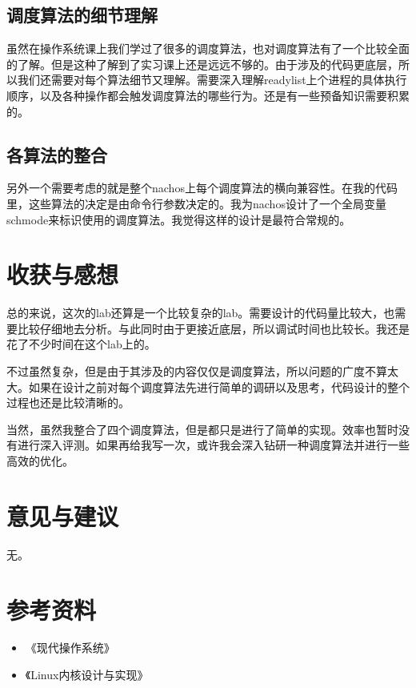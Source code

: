\documentclass{ctexart}
\begin{document}
\subsection*{调度算法的细节理解}
虽然在操作系统课上我们学过了很多的调度算法，也对调度算法有了一个比较全面的了解。但是这种了解到了实习课上还是远远不够的。由于涉及的代码更底层，所以我们还需要对每个算法细节又理解。需要深入理解readylist上个进程的具体执行顺序，以及各种操作都会触发调度算法的哪些行为。还是有一些预备知识需要积累的。
\subsection*{各算法的整合}
另外一个需要考虑的就是整个nachos上每个调度算法的横向兼容性。在我的代码里，这些算法的决定是由命令行参数决定的。我为nachos设计了一个全局变量schmode来标识使用的调度算法。我觉得这样的设计是最符合常规的。

\section{收获与感想}
总的来说，这次的lab还算是一个比较复杂的lab。需要设计的代码量比较大，也需要比较仔细地去分析。与此同时由于更接近底层，所以调试时间也比较长。我还是花了不少时间在这个lab上的。

不过虽然复杂，但是由于其涉及的内容仅仅是调度算法，所以问题的广度不算太大。如果在设计之前对每个调度算法先进行简单的调研以及思考，代码设计的整个过程也还是比较清晰的。

当然，虽然我整合了四个调度算法，但是都只是进行了简单的实现。效率也暂时没有进行深入评测。如果再给我写一次，或许我会深入钻研一种调度算法并进行一些高效的优化。

\section{意见与建议}
无。

\section{参考资料}
\begin{itemize}
\item 《现代操作系统》
\item 《Linux内核设计与实现》
\end{itemize}
\end{document}

